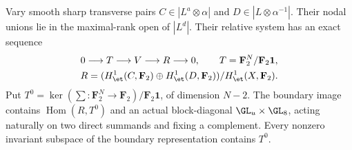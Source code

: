 \begin{lemma}
\label{lem:mixed-even-unequal-boundary-candidate}
Vary smooth sharp transverse pairs
$C\in|L^a\otimes\alpha|$ and
$D\in|L\otimes\alpha^{-1}|$. Their nodal unions lie in
the maximal-rank open of $|L^d|$. Their relative system
has an exact sequence
\[
 \begin{gathered}
 0\longrightarrow T\longrightarrow V\longrightarrow R\longrightarrow0,
 \qquad T=\mathbf F_2^N/\mathbf F_2\mathbf1,\\
 R=(H^1_{\et}(C,\mathbf F_2)\oplus H^1_{\et}(D,\mathbf F_2))
                      /H^1_{\et}(X,\mathbf F_2).
 \end{gathered}
\]
Put $T^0=\ker(\sum:\mathbf F_2^N\to\mathbf F_2)/\mathbf F_2\mathbf1$,
of dimension $N-2$. The boundary image contains
$\operatorname{Hom}(R,T^0)$ and an actual block-diagonal
$\GL_u\times\GL_8$, acting naturally on two direct summands
and fixing a complement. Every nonzero invariant subspace
of the boundary representation contains $T^0$.
\end{lemma}
